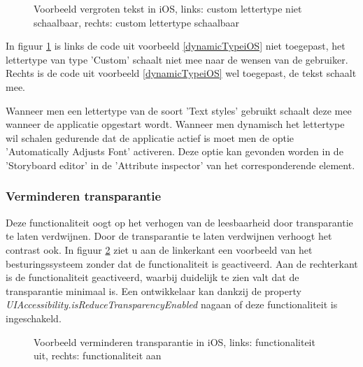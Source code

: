 \begin{figure}[h]
    \centering
    \caption{Voorbeeld vergroten tekst in iOS, links: custom lettertype niet schaalbaar, rechts: custom lettertype schaalbaar }
    \label{fig:iosFontCompare}
\end{figure}
\newpage
In figuur \ref{fig:iosFontCompare} is links de code uit voorbeeld \ref{dynamicTypeiOS} niet toegepast, het lettertype van type 'Custom' schaalt niet mee naar de wensen van de gebruiker. Rechts is de code uit voorbeeld \ref{dynamicTypeiOS} wel toegepast, de tekst schaalt mee.

Wanneer men een lettertype van de soort 'Text styles' gebruikt schaalt deze mee wanneer de applicatie opgestart wordt. Wanneer men dynamisch het lettertype wil schalen gedurende dat de applicatie actief is moet men de optie 'Automatically Adjusts Font' activeren. Deze optie kan gevonden worden in de 'Storyboard editor' in de 'Attribute inspector' van het corresponderende element.

\subsubsection{Verminderen transparantie}
Deze functionaliteit oogt op het verhogen van de leesbaarheid door transparantie te laten verdwijnen. Door de transparantie te laten verdwijnen verhoogt het contrast ook. In figuur \ref{fig:transparantieiOS} ziet u aan de linkerkant een voorbeeld van het besturingssysteem zonder dat de functionaliteit is geactiveerd. Aan de rechterkant is de functionaliteit geactiveerd, waarbij duidelijk te zien valt dat de transparantie minimaal is.
Een ontwikkelaar kan dankzij de property \emph{UIAccessibility.isReduceTransparencyEnabled} nagaan of deze functionaliteit is ingeschakeld. 
\begin{figure}[h]
    \centering
    \caption{Voorbeeld verminderen transparantie in iOS, links: functionaliteit uit, rechts: functionaliteit aan}
    \label{fig:transparantieiOS}
\end{figure}
\newpage
